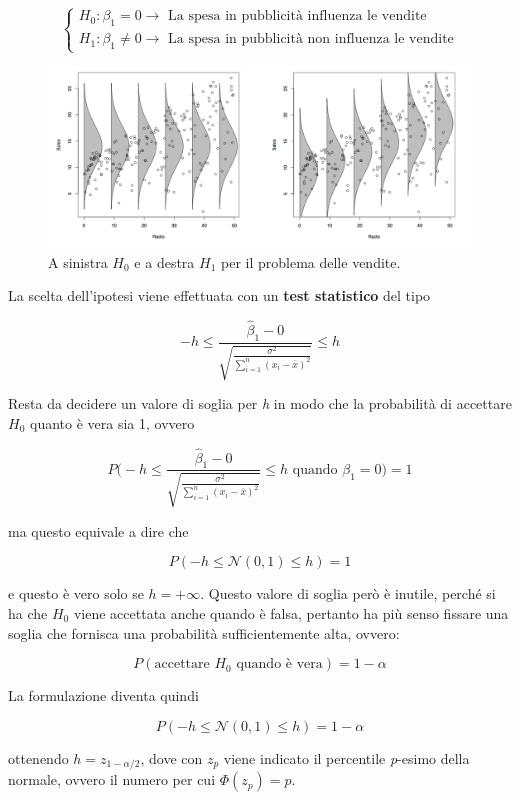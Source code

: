 $$
\begin{cases}
H_0 : \beta_1 = 0 \rightarrow \text{ La spesa in pubblicità influenza le vendite} \\
H_1 : \beta_1 \neq 0  \rightarrow \text{ La spesa in pubblicità non influenza le vendite} 
\end{cases}
$$

\begin{figure}[htbp]
	\centering
	\includegraphics[width = .9\textwidth]{./notes/immagini/l5-fig2-1.png}
	\caption{A sinistra $ H_0 $ e a destra $ H_1 $ per il problema delle vendite.}
\end{figure}


La scelta dell'ipotesi viene effettuata con un \textbf{test statistico} del tipo

$$
-h \leq \frac{\hat{\beta}_1 - 0 }{\sqrt{\frac{\sigma^2}{\sum_{i=1}^n (x_i - \bar{x})^2}}} \leq h
$$

Resta da decidere un valore di soglia per \textit{h} in modo che la probabilità di accettare $ H_0 $ quanto è vera sia 1, ovvero

$$
P\Bigg(-h \leq \frac{\hat{\beta}_1 - 0 }{\sqrt{\frac{\sigma^2}{\sum_{i=1}^n (x_i - \bar{x})^2}}} \leq h \text{ quando }\beta_1 = 0 \Bigg) = 1
$$

ma questo equivale a dire che  

$$
P(-h \leq \mathcal{N}(0,1) \leq h) = 1
$$

e questo è vero solo se $ h = + \infty $.
Questo valore di soglia però è inutile, perché si ha che $ H_0 $ viene accettata anche quando è falsa, pertanto ha più senso fissare una soglia che fornisca una probabilità sufficientemente alta, ovvero:

$$
P(\text{accettare } H_0 \text{ quando è vera}) = 1 - \alpha
$$ 

La formulazione diventa quindi

$$
P(-h \leq \mathcal{N}(0,1) \leq h) = 1 - \alpha
$$

ottenendo $ h = z_{1 - \alpha/2} $, dove con $ z_p $ viene indicato il percentile \textit{p}-esimo della normale, ovvero il numero per cui $ \Phi(z_p) = p$.

